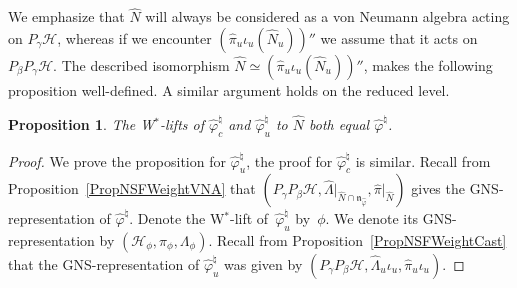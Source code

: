 \documentclass[11pt]{article}
\numberwithin{equation}{section}
\newtheorem{prop}[thm]{Proposition}
\theoremstyle{definition}
\newcommand{\cHil}{\mathcal{H}}
\begin{document}
We emphasize that $\hat{N}$ will always be considered as a von Neumann algebra acting on $P_\gamma \cHil$, whereas if we encounter $(\hat{\pi}_u\iota_u(\hat{N}_u)) ''$ we assume that it acts on $P_\beta P_\gamma \cHil$. The described isomorphism $\hat{N} \simeq (\hat{\pi}_u\iota_u(\hat{N}_u)) ''$, makes the following proposition well-def\/ined. A similar argument holds on the reduced level.

\begin{prop}\label{PropWAstLift}
The W$^\ast$-lifts of $\hat{\varphi}_{c}^\natural$ and $\hat{\varphi}_{u}^\natural$   to $\hat{N}$ both equal  $\hat{\varphi}^\natural$.
\end{prop}

\begin{proof}
We prove the proposition for $\hat{\varphi}_{u}^\natural$, the proof for $\hat{\varphi}_{c}^\natural$ is similar.
 Recall from Proposition~\ref{PropNSFWeightVNA} that $(P_\gamma P_\beta \cHil,   \hat{\Lambda}\vert_{\hat{N} \cap \mathfrak{n}_{\hat{\varphi}}} , \hat{\pi}\vert_{\hat{N}})$ gives the GNS-representation of $\hat{\varphi}^\natural$.
Denote the W$^\ast$-lift of~$\hat{\varphi}_{u}^\natural$ by~$\phi$. We denote its GNS-representation by $(\cHil_\phi, \pi_\phi, \Lambda_\phi)$. Recall from Proposition~\ref{PropNSFWeightCast} that the GNS-representation of $\hat{\varphi}_u^\natural$ was given by  $(P_\gamma P_\beta \cHil, \hat{\Lambda}_{u}  \iota_u, \hat{\pi}_{u}  \iota_u )$.


\end{proof}
\end{document}
